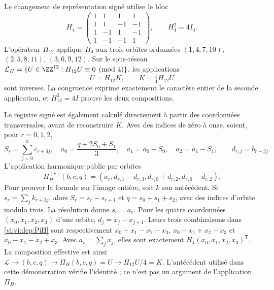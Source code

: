 Le changement de représentation signé utilise le bloc
\begin{equation}
 H_4=\begin{pmatrix}
 1&1&1&1\\1&1&-1&-1\\
 1&-1&1&-1\\1&-1&-1&1
 \end{pmatrix},\qquad H_4^2=4I_4.
 \label{vi:vi:dep:hadamard}
\end{equation}
L’opérateur \(H_{12}\) applique \(H_4\) aux trois orbites ordonnées
\((1,4,7,10)\), \((2,5,8,11)\), \((3,6,9,12)\).
Sur le sous-réseau
\(\mathcal L_H=\{U\in\ZZ^{12}:H_{12}U\equiv0\pmod4\}\),
les applications
\begin{equation}
 U=H_{12}K,\qquad K=\tfrac14H_{12}U
 \label{vi:vi:dep:K-reversible}
\end{equation}
sont inverses. La congruence exprime exactement le caractère entier de la
seconde application, et \(H_{12}^2=4I\) prouve les deux compositions.

Le registre signé est également calculé directement à partir des coordonnées
transversales, avant de reconstruire \(K\). Avec des indices de zéro à onze,
soient, pour \(r=0,1,2\),
\[
 S_r=\sum_{j=0}^3c_{r+3j},\quad
 a_0=\frac{q+2S_0+S_1}{3},\quad
 a_1=a_0-S_0,\quad a_2=a_1-S_1,
 \qquad d_{r,j}=b_{r+3j}.
\]
L'application harmonique publie par orbites
\begin{equation}
 \Pi_H^{(r)}(b,c,q)=
 (a_r,d_{r,1}-d_{r,3},d_{r,0}+d_{r,2},d_{r,0}-d_{r,2}).
 \label{vi:vi:dep:PiH}
\end{equation}
Pour prouver la formule sur l’image entière, soit \(k\) son
antécédent. Si \(s_r=\sum_jk_{r+3j}\), alors
\(S_r=s_r-s_{r+1}\) et \(q=s_0+s_1+s_2\), avec des indices d’orbite
modulo trois. La résolution donne \(s_r=a_r\). Pour les quatre coordonnées
\((x_0,x_1,x_2,x_3)\) d’une orbite,
\(d_j=x_j-x_{j+1}\). Leurs trois combinaisons dans
\eqref{vi:vi:dep:PiH} sont respectivement
\(x_0+x_1-x_2-x_3\), \(x_0-x_1+x_2-x_3\) et
\(x_0-x_1-x_2+x_3\). Avec \(a_r=\sum_jx_j\), elles sont
exactement \(H_4(x_0,x_1,x_2,x_3)^{\mathsf T}\).
La composition effective est ainsi
\(\mathscr L\to(b,c,q)\to\Pi_H(b,c,q)=U\to H_{12}U/4=K\).
L’antécédent utilisé dans cette démonstration vérifie l’identité ;
ce n’est pas un argument de l’application \(\Pi_H\).

